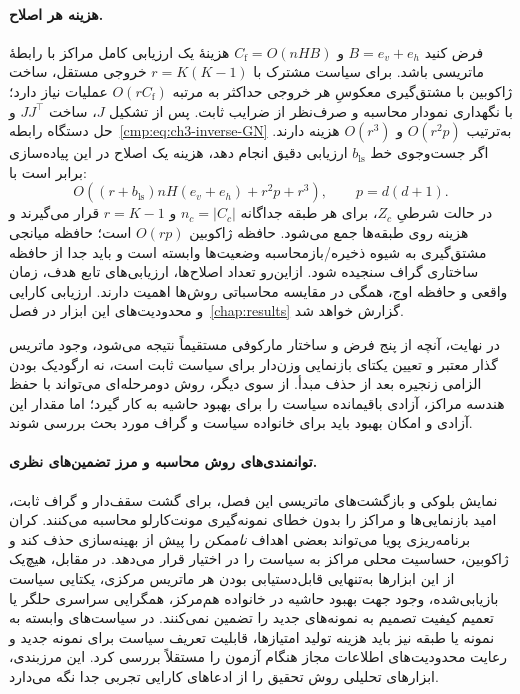 \paragraph{هزینه هر اصلاح.}
فرض کنید $B=e_v+e_h$ و $C_{\mathrm f}=O(nHB)$ هزینهٔ یک ارزیابی کامل مراکز با رابطهٔ ماتریسی باشد. برای سیاست مشترک با $r=K(K-1)$ خروجی مستقل، ساخت ژاکوبین با مشتق‌گیری معکوسِ هر خروجی حداکثر به مرتبه $O(rC_{\mathrm f})$ عملیات نیاز دارد؛ با نگهداری نمودار محاسبه و صرف‌نظر از ضرایب ثابت. پس از تشکیل $J$، ساخت $JJ^\top$ و حل دستگاه رابطه~\eqref{cmp:eq:ch3-inverse-GN} به‌ترتیب $O(r^2p)$ و $O(r^3)$ هزینه دارند. اگر جست‌وجوی خط $b_{\mathrm{ls}}$ ارزیابی دقیق انجام دهد، هزینه یک اصلاح در این پیاده‌سازی برابر است با:
\begin{equation}\label{cmp:eq:ch3-inverse-complexity}
\boxed{O\!\left((r+b_{\mathrm{ls}})nH(e_v+e_h)
+r^2p+r^3\right),\qquad
p=d(d+1).}
\end{equation}
در حالت شرطیِ $Z_c$، برای هر طبقه جداگانه $n_c=|C_c|$ و $r=K-1$ قرار می‌گیرند و هزینه روی طبقه‌ها جمع می‌شود. حافظه ژاکوبین $O(rp)$ است؛ حافظه میانجی مشتق‌گیری به شیوه ذخیره/بازمحاسبه وضعیت‌ها وابسته است و باید جدا از حافظه ساختاری گراف سنجیده شود. ازاین‌رو تعداد اصلاح‌ها، ارزیابی‌های تابع هدف، زمان واقعی و حافظه اوج، همگی در مقایسه محاسباتی روش‌ها اهمیت دارند. ارزیابی کارایی و محدودیت‌های این ابزار در فصل~\ref{chap:results} گزارش خواهد شد.


در نهایت، آنچه از
پنج فرض و ساختار
مارکوفی مستقیماً
نتیجه می‌شود،
وجود ماتریس گذار
معتبر و تعیین
یکتای بازنمایی
وزن‌دار برای
سیاست ثابت است،
نه ارگودیک بودن
الزامی زنجیره
بعد از حذف مبدأ.
از سوی دیگر،
روش دومرحله‌ای
می‌تواند با حفظ
هندسه مراکز،
آزادی باقیمانده
سیاست را برای
بهبود حاشیه
به کار گیرد؛
اما مقدار این آزادی
و امکان بهبود
باید برای خانواده
سیاست و گراف
مورد بحث بررسی
شوند.

\paragraph{توانمندی‌های روش محاسبه و مرز تضمین‌های نظری.}
نمایش بلوکی و بازگشت‌های
ماتریسی این فصل،
برای گشت سقف‌دار و
گراف ثابت، امید
بازنمایی‌ها و مراکز را
بدون خطای نمونه‌گیری
مونت‌کارلو محاسبه می‌کنند.
کران برنامه‌ریزی پویا
می‌تواند بعضی اهداف
\emph{ناممکن} را پیش از
بهینه‌سازی حذف کند و
ژاکوبین، حساسیت محلی
مراکز به سیاست را
در اختیار قرار می‌دهد.
در مقابل، هیچ‌یک از
این ابزارها به‌تنهایی
قابل‌دستیابی بودن هر
ماتریس مرکزی، یکتایی
سیاست بازیابی‌شده،
وجود جهت بهبود حاشیه
در خانواده هم‌مرکز،
همگرایی سراسری حلگر
یا تعمیم کیفیت تصمیم
به نمونه‌های جدید را
تضمین نمی‌کنند.
در سیاست‌های وابسته
به نمونه یا طبقه نیز
باید هزینه تولید امتیازها،
قابلیت تعریف سیاست برای
نمونه جدید و رعایت
محدودیت‌های اطلاعات
مجاز هنگام آزمون را
مستقلاً بررسی کرد.
این مرزبندی، ابزارهای
تحلیلی روش تحقیق را
از ادعاهای کارایی تجربی
جدا نگه می‌دارد.



